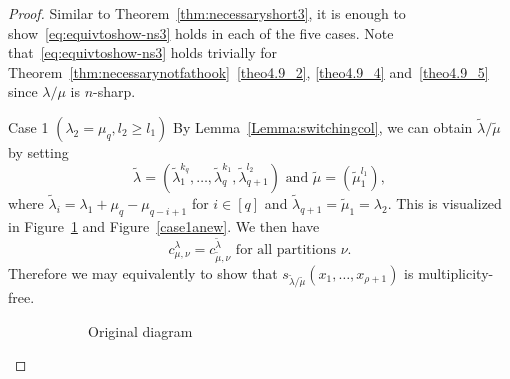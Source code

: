 \begin{proof}
Similar to Theorem~\ref{thm:necessaryshort3}, it is enough to show~\eqref{eq:equivtoshow-ns3} holds in each of the five cases. Note that~\eqref{eq:equivtoshow-ns3} holds trivially for Theorem~\ref{thm:necessarynotfathook}~\ref{theo4.9_2}, \ref{theo4.9_4} and~\ref{theo4.9_5} since $\lambda/\mu$ is $n$-sharp. 

\begin{Case}
{Case 1 $(\lambda_2 = \mu_q, l_2\geq l_1)$} 
By Lemma~\ref{Lemma:switchingcol}, we can obtain $\tilde\lambda/\tilde\mu$ by setting
\[
\tilde\lambda = (\tilde\lambda_1^{k_q}, \ldots,\tilde\lambda_q^{k_1},\tilde\lambda_{q+1}^{l_2})\text{ and }\tilde\mu = (\tilde\mu_1^{l_1}),
\]
where $\tilde\lambda_i = \lambda_1+\mu_q-\mu_{q-i+1}$ for $i\in [q]$ and $\tilde\lambda_{q+1} = \tilde\mu_1 = \lambda_2$. This is visualized in Figure~\ref{case1aoriginal} and Figure~\ref{case1anew}. We then have
\[
c^{\lambda}_{\mu,\nu} = c^{\tilde\lambda}_{\tilde\mu,\nu}\text{ for all partitions }\nu.
\]
Therefore we may equivalently to show that $s_{\tilde\lambda/\tilde\mu}(x_1,\ldots,x_{\rho+1})$ is multiplicity-free.

\begin{figure}[htb]\centering
 \begin{subfigure}{0.4\textwidth}
 \caption{Original diagram}
 \label{case1aoriginal}
 \end{subfigure}
 \hspace{1cm}
 \begin{subfigure}{0.47\textwidth}
\end{subfigure}
\end{figure}
\end{Case}
\end{proof}

